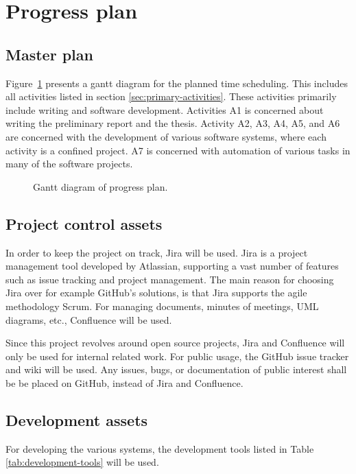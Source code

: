 \section{Progress plan}

\subsection{Master plan}
\label{sec:master-plan}
Figure~\ref{fig:gantt-diagram-progress-plan} presents a gantt diagram for the planned time scheduling. This includes all activities listed in section \ref{sec:primary-activities}. These activities primarily include writing and software development. Activities A1 is concerned about writing the preliminary report and the thesis. Activity A2, A3, A4, A5, and A6 are concerned with the development of various software systems, where each activity is a confined project. A7 is concerned with automation of various tasks in many of the software projects.

{
\begin{figure}[h]
\thispagestyle{empty}
	\clearpage
	
	\caption{Gantt diagram of progress plan.}
	\label{fig:gantt-diagram-progress-plan}
\end{figure}
\clearpage
}

\subsection{Project control assets}
\label{sec:project-control-assets}
In order to keep the project on track, Jira \cite{jira} will be used. Jira is a project management tool developed by Atlassian, supporting a vast number of features such as issue tracking and project management. The main reason for choosing Jira over for example GitHub's solutions, is that Jira supports the agile methodology Scrum. For managing documents, minutes of meetings, UML diagrams, etc., Confluence \cite{confluence} will be used.

Since this project revolves around open source projects, Jira and Confluence will only be used for internal related work. For public usage, the GitHub issue tracker and wiki will be used. Any issues, bugs, or documentation of public interest shall be be placed on GitHub, instead of Jira and Confluence.

\subsection{Development assets}
For developing the various systems, the development tools listed in Table \ref{tab:development-tools} will be used.

